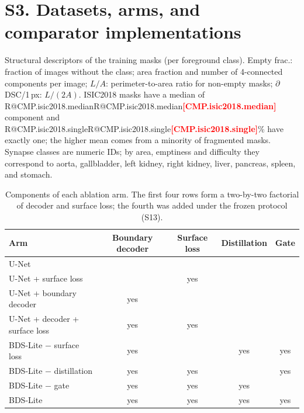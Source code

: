 \documentclass[10pt]{article}
\makeatletter
\newcommand{\R}[1]{\ifcsname R@#1\endcsname\csname R@#1\endcsname\else\textbf{\textcolor{red}{[#1]}}\fi}
\makeatother
\begin{document}
\section*{S3. Datasets, arms, and comparator implementations}
{\small}

\medskip\noindent Structural descriptors of the training masks (per foreground class). Empty frac.: fraction of images without the class; area fraction and number of 4-connected components per image; $L/A$: perimeter-to-area ratio for non-empty masks; $\partial$DSC/1\,px: $L/(2A)$. ISIC2018 masks have a median of \R{CMP.isic2018.median} component and \R{CMP.isic2018.single}\% have exactly one; the higher mean comes from a minority of fragmented masks. Synapse classes are numeric IDs; by area, emptiness and difficulty they correspond to aorta, gallbladder, left kidney, right kidney, liver, pancreas, spleen, and stomach.

\begin{table}[ht]\centering\small
\begin{tabular}{lcccc}
\toprule
Arm & Boundary decoder & Surface loss & Distillation & Gate \\
\midrule
U-Net & & & & \\
U-Net + surface loss & & yes & & \\
U-Net + boundary decoder & yes & & & \\
U-Net + decoder + surface loss & yes & yes & & \\
BDS-Lite $-$ surface loss & yes & & yes & yes \\
BDS-Lite $-$ distillation & yes & yes & & yes \\
BDS-Lite $-$ gate & yes & yes & yes & \\
BDS-Lite & yes & yes & yes & yes \\
\bottomrule
\end{tabular}
\caption{Components of each ablation arm. The first four rows form a two-by-two factorial of decoder and surface loss; the fourth was added under the frozen protocol (S13).}
\end{table}
\end{document}
